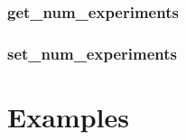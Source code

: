 \documentclass[10pt]{book}
\begin{document}
\subsubsection{\textbf{get\_num\_experiments}}\label{subsec:getnumexp}


\subsubsection{\textbf{set\_num\_experiments}}\label{subsec:setnumexp}


\clearpage


\section{\qcor Examples}\label{sec:examples}


\clearpage



\end{document}
